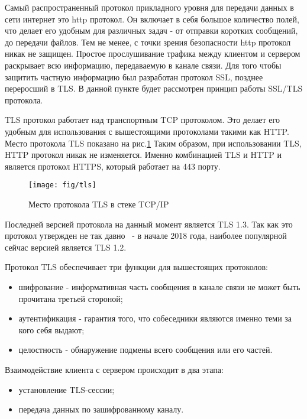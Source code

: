 Самый распространенный протокол прикладного уровня для передачи данных в сети интернет это http протокол. Он включает в себя большое количество полей, что делает его удобным для различных задач - от отправки коротких сообщений, до передачи файлов. Тем не менее, с точки зрения безопасности http протокол никак не защищен. Простое прослушивание трафика между клиентом и сервером раскрывает всю информацию, передаваемую в канале связи. Для того чтобы защитить частную информацию был разработан протокол SSL, позднее переросший в TLS. В данной пункте будет рассмотрен принцип работы SSL/TLS протокола. 

TLS протокол работает над транспортным TCP протоколом. Это делает его удобным для использования с вышестоящими протоколами такими как HTTP. Место протокола TLS показано на рис.\ref{fig:TLSinTCPIP} Таким образом, при использовании TLS, HTTP протокол никак не изменяется. Именно комбинацией TLS и HTTP и является протокол HTTPS, который работает на 443 порту.

\begin{figure}[H]
	\centering
	\texttt{[image: fig/tls]}
	\caption{Место протокола TLS в стеке TCP/IP}
	\label{fig:TLSinTCPIP}
\end{figure}

Последней версией протокола на данный момент является TLS 1.3. Так как это протокол утвержден не так давно~\cite{Kinsta} -  в начале 2018 года, наиболее популярной сейчас версией является TLS 1.2.

Протокол TLS обеспечивает три функции для вышестоящих протоколов:

\begin{itemize}
	\item шифрование - информативная часть сообщения в канале связи не может быть прочитана третьей стороной;
	\item аутентификация - гарантия того, что собеседники являются именно теми за кого себя выдают;
	\item целостность - обнаружение подмены всего сообщения или его частей.
\end{itemize}

Взаимодействие клиента с сервером происходит в два этапа:

\begin{itemize}
	\item установление TLS-сессии;
	\item передача данных по зашифрованному каналу.
\end{itemize}


